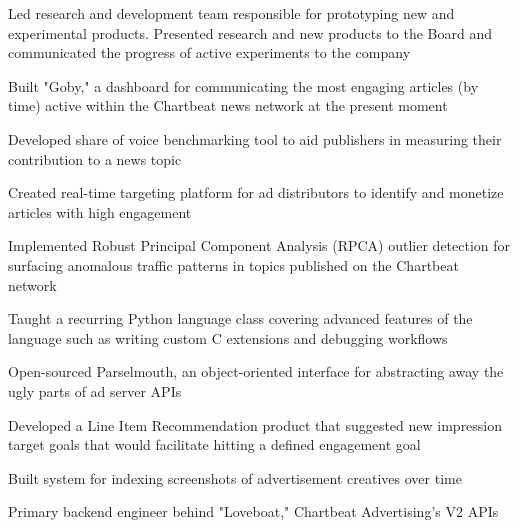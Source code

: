 \documentclass[]{resume-openfont}
\begin{document}
    \begin{tightemize}
        \item
            Led research and development team responsible for prototyping new
            and experimental products. Presented research and new products to
            the Board and communicated the progress of active experiments to
            the company
        \item
            Built "Goby," a dashboard for communicating the most engaging
            articles (by time) active within the Chartbeat news network at the
            present moment
        \item
            Developed share of voice benchmarking tool to aid publishers in
            measuring their contribution to a news topic
        \item
            Created real-time targeting platform for ad distributors to
            identify and monetize articles with high engagement
        \item
            Implemented Robust Principal Component Analysis (RPCA) outlier
            detection for surfacing anomalous traffic patterns in topics
            published on the Chartbeat network
        \item
            Taught a recurring Python language class covering advanced features
            of the language such as writing custom C extensions and debugging
            workflows
    \end{tightemize}
    \vspace{5pt}

    \begin{tightemize}
        \item
            Open-sourced Parselmouth, an object-oriented interface for
            abstracting away the ugly parts of ad server APIs
        \item
            Developed a Line Item Recommendation product that suggested new
            impression target goals that would facilitate hitting a defined
            engagement goal
        \item
            Built system for indexing screenshots of advertisement creatives
            over time
        \item
            Primary backend engineer behind "Loveboat," Chartbeat Advertising's
            V2 APIs
    \end{tightemize}
\end{document}
